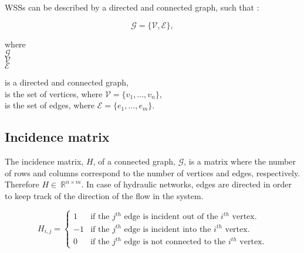 WSSs can be described by a directed and connected graph, such that \cite{graph_intro}: 

\begin{equation}
  \label{Numberofchords}
  \mathcal{G} = \{\mathcal{V}, \mathcal{E} \} ,
\end{equation}

\begin{minipage}[t]{0.2\textwidth}
where\\
\hspace*{8mm} $\mathcal{G} $ \\
\hspace*{8mm} $\mathcal{V} $ \\
\hspace*{8mm} $\mathcal{E} $
\end{minipage}
\begin{minipage}[t]{0.68\textwidth}
\vspace*{2mm}
is a directed and connected graph,\\
is the set of vertices, where $\mathcal{V} = \{v_1, ..., v_n\}$,\\
is the set of edges, where $\mathcal{E} = \{e_1, ..., e_m\}$. 
\end{minipage}

\subsection{Incidence matrix}
\label{incidence_matrix}

The incidence matrix, $H$, of a connected graph, $\mathcal{G}$, is a matrix where the number of rows and columns correspond to the number of vertices and edges, respectively. Therefore $H\in \: \mathbb{R}^{n \times m}$. In case of hydraulic networks, edges are directed in order to keep track of the direction of the flow in the system. 

\begin{equation}
\label{DiGraph}
 H_{i,j} =
		\left\{
		\begin{array}{ll}
		
		1 			&      \text{if the $j^{th}$ edge is incident out of the $i^{th}$ vertex}.	
\\
	    -1          &      \text{if the $j^{th}$ edge is incident into the $i^{th}$ vertex}.
\\
        0           &      \text{if the $j^{th}$ edge is not connected to the $i^{th}$ vertex}.

		\end{array}
		\right.
\end{equation}	

